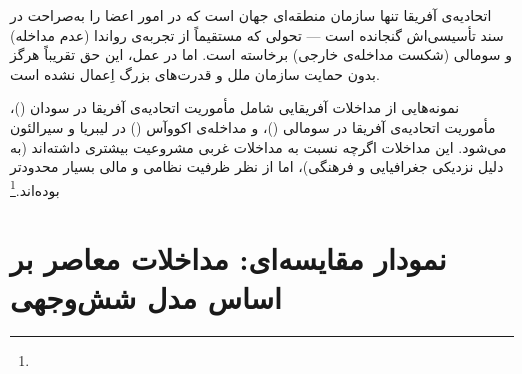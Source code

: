 \begin{tcolorbox}[legalbox, title={نکته‌ی حقوقی: حق مداخله در اتحادیه‌ی آفریقا}]
اتحادیه‌ی آفریقا تنها سازمان منطقه‌ای جهان است که  در امور اعضا را به‌صراحت در سند تأسیسی‌اش گنجانده است — تحولی که مستقیماً از تجربه‌ی رواندا (عدم مداخله) و سومالی (شکست مداخله‌ی خارجی) برخاسته است. اما در عمل، این حق تقریباً هرگز بدون حمایت سازمان ملل و قدرت‌های بزرگ اِعمال نشده است.
\end{tcolorbox}

نمونه‌هایی از مداخلات آفریقایی شامل مأموریت اتحادیه‌ی آفریقا در سودان ()، مأموریت اتحادیه‌ی آفریقا در سومالی ()، و مداخله‌ی اکووآس () در لیبریا و سیرالئون می‌شود. این مداخلات اگرچه نسبت به مداخلات غربی مشروعیت بیشتری داشته‌اند (به دلیل نزدیکی جغرافیایی و فرهنگی)، اما از نظر ظرفیت نظامی و مالی بسیار محدودتر بوده‌اند.\footnote{}


\section{نمودار مقایسه‌ای: مداخلات معاصر بر اساس مدل شش‌وجهی}
\label{sec:ch10-tikz-comparison}


